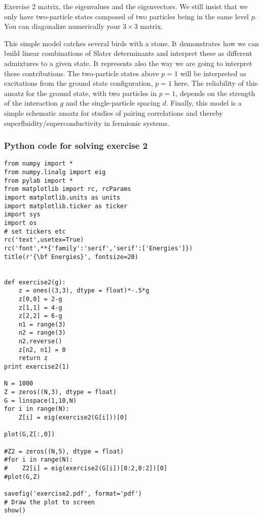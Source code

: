 \documentclass{beamer}
\begin{document}
\begin{frame}
\begin{block}{Exercise 2 }
\noindent
matrix, the eigenvalues and the eigenvectors. We still insist that we only have two-particle states composed of two particles being in the same
level $p$. You can diagonalize numerically your $3\times 3$ matrix.

This simple model catches several birds with a stone. It demonstrates how we can build linear combinations
of Slater determinants and interpret these as different admixtures to a given state. It represents also the way we are going to interpret these contributions.  The two-particle states above $p=1$ will be interpreted as 
excitations from the ground state configuration, $p=1$ here.  The reliability of this ansatz for the ground state, 
with two particles in $p=1$,
depends on the strength of the interaction $g$ and the single-particle spacing $d$.
Finally, this model is a simple schematic ansatz for studies of pairing correlations and thereby superfluidity/superconductivity  
in fermionic systems. 
\end{block}
\end{frame}

\begin{frame}
\frametitle{Python code for solving exercise 2}

\begin{block}{}
\begin{verbatim}
from numpy import *
from numpy.linalg import eig
from pylab import *
from matplotlib import rc, rcParams
import matplotlib.units as units
import matplotlib.ticker as ticker
import sys
import os
# set tickers etc
rc('text',usetex=True)
rc('font',**{'family':'serif','serif':['Energies']})
title(r'{\bf Energies}', fontsize=20)     


def exercise2(g):
    z = ones((3,3), dtype = float)*-.5*g
    z[0,0] = 2-g
    z[1,1] = 4-g
    z[2,2] = 6-g
    n1 = range(3)
    n2 = range(3)
    n2.reverse()
    z[n2, n1] = 0
    return z
print exercise2(1)

N = 1000
Z = zeros((N,3), dtype = float)
G = linspace(1,10,N)
for i in range(N):
    Z[i] = eig(exercise2(G[i]))[0]

plot(G,Z[:,0])

#Z2 = zeros((N,5), dtype = float)
#for i in range(N):
#    Z2[i] = eig(exercise2(G[i])[0:2,0:2])[0]
#plot(G,Z)

savefig('exercise2.pdf', format='pdf')
# Draw the plot to screen
show()
\end{verbatim}
\end{block}
\end{frame}
\end{document}
